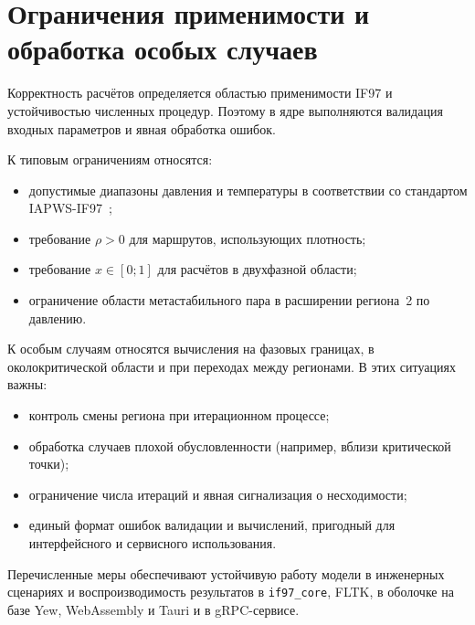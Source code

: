 \section{Ограничения применимости и обработка особых случаев}

Корректность расчётов определяется
областью применимости IF97 и устойчивостью численных процедур.
Поэтому в ядре выполняются
валидация входных параметров и явная обработка ошибок.

К типовым ограничениям относятся:
\begin{itemize}
\item допустимые диапазоны давления и температуры в соответствии со стандартом IAPWS-IF97~\cite{iapws_if97_2012};
\item требование $\rho > 0$ для маршрутов, использующих плотность;
\item требование $x \in [0; 1]$ для расчётов в двухфазной области;
\item ограничение области метастабильного пара в расширении региона~2 по давлению.
\end{itemize}

К особым случаям относятся вычисления на фазовых границах, в околокритической области и при переходах между регионами.
В этих ситуациях важны:
\begin{itemize}
\item контроль смены региона при итерационном процессе;
\item обработка случаев плохой обусловленности (например, вблизи критической точки);
\item ограничение числа итераций и явная сигнализация о несходимости;
\item единый формат ошибок валидации и вычислений, пригодный для интерфейсного и сервисного использования.
\end{itemize}

Перечисленные меры обеспечивают
устойчивую работу модели в инженерных сценариях
и воспроизводимость результатов в \texttt{if97\_core},
FLTK,
в оболочке на базе Yew, WebAssembly и Tauri
и в gRPC-сервисе.

